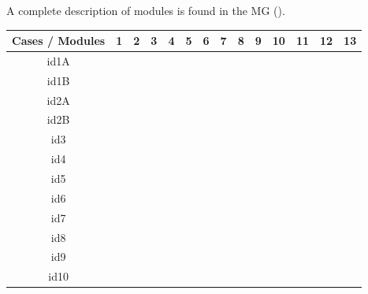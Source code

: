 \documentclass[12pt, titlepage]{article}
\begin{document}
A complete description of modules is found in the MG (\citet{LBM_MG_PM}).

\begin{table}[!h]
	\begin{center}
		\begin{tabular}{| c | c | c | c | c | c | c | c | c | c | c | c | c | c |}
			\hline
			Cases / Modules & 1 & 2 & 3 & 4 & 5 & 6 & 7 & 8 & 9 & 10 & 11 & 12 & 13\\
			\hline
			id1A &\checkmark &\checkmark &\checkmark & & & & & & & & &\checkmark &\\
			\hline
			id1B &\checkmark &\checkmark & \checkmark& & & & & & & & & &\\
			\hline
			id2A &\checkmark & \checkmark&\checkmark & \checkmark& & & & & & & & \checkmark&\checkmark\\
			\hline
			id2B &\checkmark &\checkmark &\checkmark &\checkmark & & & & & & & &\checkmark &\checkmark\\
			\hline
			id3 &\checkmark &\checkmark &\checkmark & \checkmark & \checkmark& \checkmark&\checkmark & \checkmark& \checkmark&\checkmark & &\checkmark &\checkmark\\
			\hline
			id4 &\checkmark &\checkmark &\checkmark & \checkmark & \checkmark& \checkmark&\checkmark & \checkmark& \checkmark&\checkmark & &\checkmark &\checkmark\\
			\hline
			id5 &\checkmark &\checkmark &\checkmark & \checkmark & \checkmark& \checkmark&\checkmark & \checkmark& \checkmark&\checkmark & &\checkmark &\checkmark\\
			\hline
			id6 &\checkmark &\checkmark &\checkmark & \checkmark & \checkmark& \checkmark&\checkmark & \checkmark& \checkmark&\checkmark & &\checkmark &\checkmark\\
			\hline
			id7 &\checkmark &\checkmark &\checkmark & \checkmark & \checkmark& \checkmark&\checkmark & \checkmark& \checkmark&\checkmark & &\checkmark &\checkmark\\
			\hline
			id8 &\checkmark &\checkmark &\checkmark & \checkmark & \checkmark& \checkmark&\checkmark & \checkmark& \checkmark&\checkmark & &\checkmark &\checkmark\\
			\hline
			id9 &\checkmark &\checkmark &\checkmark & \checkmark & \checkmark& \checkmark&\checkmark & \checkmark& \checkmark&\checkmark & &\checkmark &\checkmark\\
			\hline
			id10 &\checkmark &\checkmark &\checkmark & \checkmark & \checkmark& \checkmark&\checkmark & \checkmark& \checkmark&\checkmark & &\checkmark &\checkmark\\

\end{tabular}
\end{center}
\end{table}
\end{document}
